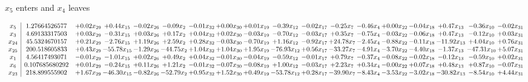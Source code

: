 \documentclass[9pt]{article}
\begin{document}
 $ x_{5} $ enters and $ x_{4} $ leaves 

 \[\begin{array}{c| c c@{\hskip 2pt} c@{\hskip 2pt} c@{\hskip 2pt} c@{\hskip 2pt} c@{\hskip 2pt} c@{\hskip 2pt} c@{\hskip 2pt} c@{\hskip 2pt} c@{\hskip 2pt} c@{\hskip 2pt} c@{\hskip 2pt} c@{\hskip 2pt} c@{\hskip 2pt} c@{\hskip 2pt} c@{\hskip 2pt} c@{\hskip 2pt} }
 x_{5}   &  1.27664526577 & +  0.02 x_{29} & +  0.44 x_{15} & -0.02 x_{26} & -0.09 x_{2} & -0.01 x_{32} & +  0.00 x_{30} & +  0.01 x_{19} & -0.39 x_{12} & -0.02 x_{17} & -0.25 x_{7} & -0.46 x_{4} & +  0.00 x_{22} & -0.04 x_{18} & +  0.47 x_{13} & -0.36 x_{10} & -0.02 x_{31}\\
 x_{3}   &  4.69133317503 & +  0.03 x_{29} & -0.31 x_{15} & +  0.03 x_{26} & +  0.17 x_{2} & +  0.04 x_{32} & +  0.02 x_{30} & -0.03 x_{19} & -0.70 x_{12} & -0.03 x_{17} & +  0.35 x_{7} & -0.75 x_{4} & -0.03 x_{22} & -0.06 x_{18} & +  0.47 x_{13} & -0.12 x_{10} & +  0.03 x_{31}\\
 x_{24}   &  45.5324670157 & +  0.21 x_{29} & -2.76 x_{15} & +  1.19 x_{26} & +  2.59 x_{2} & +  0.28 x_{32} & -0.03 x_{30} & -0.70 x_{19} & +  1.16 x_{12} & -0.92 x_{17} & + 24.78 x_{7} & -2.45 x_{4} & -0.88 x_{22} & -0.11 x_{18} & -11.92 x_{13} & +  4.04 x_{10} & +  0.76 x_{31}\\
 x_{25}   &  200.518605833 & +  0.43 x_{29} & -55.78 x_{15} & -1.29 x_{26} & -44.75 x_{2} & +  1.04 x_{32} & +  1.04 x_{30} & +  1.95 x_{19} & -76.93 x_{12} & +  0.56 x_{17} & -33.27 x_{7} & -4.91 x_{4} & -3.70 x_{22} & -4.40 x_{18} & -1.37 x_{13} & -47.31 x_{10} & +  5.07 x_{31}\\
 x_{1}   &  4.56417493071 & -0.01 x_{29} & -1.01 x_{15} & +  0.02 x_{26} & +  0.49 x_{2} & +  0.04 x_{32} & -0.01 x_{30} & -0.04 x_{19} & -0.59 x_{12} & -0.01 x_{17} & +  0.79 x_{7} & -0.37 x_{4} & -0.08 x_{22} & -0.02 x_{18} & -0.12 x_{13} & -0.59 x_{10} & +  0.02 x_{31}\\
 x_{6}   &  0.107685680292 & +  0.01 x_{29} & -0.24 x_{15} & +  0.11 x_{26} & +  1.21 x_{2} & -0.01 x_{32} & -0.07 x_{30} & -0.08 x_{19} & +  1.00 x_{12} & -0.03 x_{17} & +  2.23 x_{7} & +  0.34 x_{4} & -0.00 x_{22} & +  0.07 x_{18} & +  0.48 x_{13} & +  0.87 x_{10} & -0.07 x_{31}\\
 x_{23}   &  218.899555902 & +  1.67 x_{29} & -46.30 x_{15} & -0.82 x_{26} & -52.79 x_{2} & +  0.95 x_{32} & +  1.52 x_{30} & +  0.49 x_{19} & -53.78 x_{12} & +  0.28 x_{17} & -39.90 x_{7} & -8.43 x_{4} & -3.53 x_{22} & -3.02 x_{18} & -30.82 x_{13} & -8.54 x_{10} & +  4.44 x_{31}\\

\end{array}\]
\end{document}
